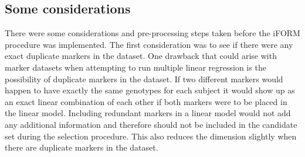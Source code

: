 \documentclass[11pt,]{book}
\theoremstyle{definition}
\theoremstyle{definition}
\theoremstyle{remark}
\begin{document}
\subsection{Some considerations}\label{some-considerations}

There were some considerations and pre-processing steps taken before the
iFORM procedure was implemented. The first consideration was to see if
there were any exact duplicate markers in the dataset. One drawback that
could arise with marker datasets when attempting to run multiple linear
regression is the possibility of duplicate markers in the dataset. If
two different markers would happen to have exactly the same genotypes
for each subject it would show up as an exact linear combination of each
other if both markers were to be placed in the linear model. Including
redundant markers in a linear model would not add any additional
information and therefore should not be included in the candidate set
during the selection procedure. This also reduces the dimension slightly
when there are duplicate markers in the dataset.
\end{document}

